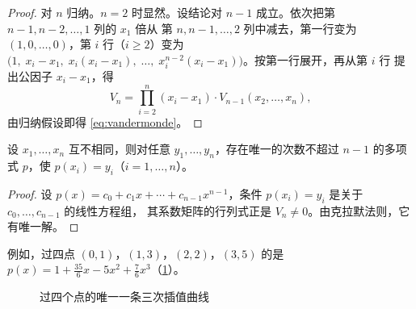 \begin{proof}
对 $n$ 归纳。$n=2$ 时显然。设结论对 $n-1$ 成立。依次把第 $n-1,n-2,\dotsc,1$ 列的 $x_1$ 倍从
第 $n,n-1,\dotsc,2$ 列中减去，第一行变为 $(1,0,\dotsc,0)$，第 $i$ 行（$i\ge2$）变为
$\bigl(1,\;x_i-x_1,\;x_i(x_i-x_1),\;\dotsc,\;x_i^{n-2}(x_i-x_1)\bigr)$。按第一行展开，再从第 $i$ 行
提出公因子 $x_i-x_1$，得
\[
  V_n=\prod_{i=2}^n(x_i-x_1)\cdot V_{n-1}(x_2,\dotsc,x_n),
\]
由归纳假设即得 \cref{eq:vandermonde}。
\end{proof}

\begin{corollary}[插值多项式的存在唯一性]\label{cor:interpolation}
设 $x_1,\dotsc,x_n$ 互不相同，则对任意 $y_1,\dotsc,y_n$，存在唯一的次数不超过 $n-1$ 的多项式
$p$，使 $p(x_i)=y_i$（$i=1,\dotsc,n$）。
\end{corollary}

\begin{proof}
设 $p(x)=c_0+c_1x+\dotsb+c_{n-1}x^{n-1}$，条件 $p(x_i)=y_i$ 是关于 $c_0,\dotsc,c_{n-1}$ 的线性方程组，
其系数矩阵的行列式正是 $V_n\ne0$。由克拉默法则，它有唯一解。
\end{proof}

例如，过四点 $(0,1)$，$(1,3)$，$(2,2)$，$(3,5)$ 的是
$p(x)=1+\frac{35}{6}x-5x^2+\frac{7}{6}x^3$（\cref{fig:interp}）。

\begin{figure}[htbp]
\centering
{}
\caption{过四个点的唯一一条三次插值曲线}
\label{fig:interp}
\end{figure}

